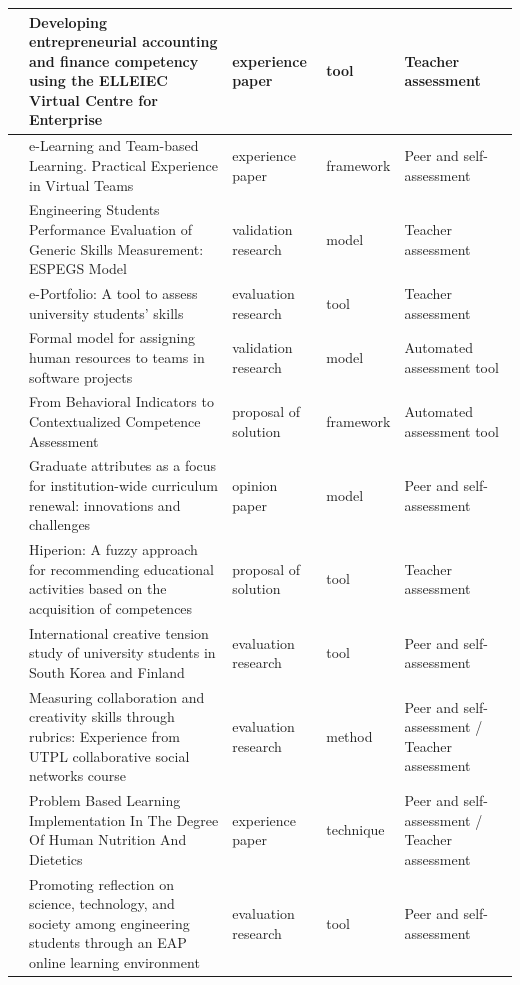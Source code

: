 \begin{landscape}
\begin{center}
\begin{longtable}{| c | m{9cm} | m{4cm} | m{2.5cm} | m{3.5cm} |}
    \hline
    \cite{ward2011developing} & Developing entrepreneurial accounting and finance competency using the ELLEIEC Virtual Centre for Enterprise & experience paper & tool & Teacher assessment \\
    \hline
    \cite{ficapal2015learning} & e-Learning and Team-based Learning. Practical Experience in Virtual Teams & experience paper & framework & Peer and self-assessment \\
    \hline
    \cite{rashid2008engineering} & Engineering Students Performance Evaluation of Generic Skills Measurement: ESPEGS Model & validation research & model & Teacher assessment \\
    \hline
    \cite{rodriguez2010portfolio} & e-Portfolio: A tool to assess university students' skills & evaluation research & tool & Teacher assessment \\
    \hline
    \cite{andre2011formal} & Formal model for assigning human resources to teams in software projects & validation research & model & Automated assessment tool \\
    \hline
    \cite{bedek2011behavioral} & From Behavioral Indicators to Contextualized Competence Assessment & proposal of solution & framework & Automated assessment tool \\
    \hline
    \cite{oliver2013graduate} & Graduate attributes as a focus for institution-wide curriculum renewal: innovations and challenges & opinion paper & model & Peer and self-assessment \\
    \hline
    \cite{serrano2013hiperion} & Hiperion: A fuzzy approach for recommending educational activities based on the acquisition of competences & proposal of solution & tool & Teacher assessment \\
    \hline
    \cite{chang2009international} & International creative tension study of university students in South Korea and Finland & evaluation research & tool & Peer and self-assessment \\
    \hline
    \cite{piedra2010measuring} & Measuring collaboration and creativity skills through rubrics: Experience from UTPL collaborative social networks course & evaluation research & method & Peer and self-assessment / Teacher assessment \\
    \hline
    \cite{lasa2013problem} & Problem Based Learning Implementation In The Degree Of Human Nutrition And Dietetics & experience paper & technique & Peer and self-assessment / Teacher assessment \\
    \hline
    \cite{arno2011promoting} & Promoting reflection on science, technology, and society among engineering students through an EAP online learning environment & evaluation research & tool & Peer and self-assessment \\

\end{longtable}
\end{center}
\end{landscape}
